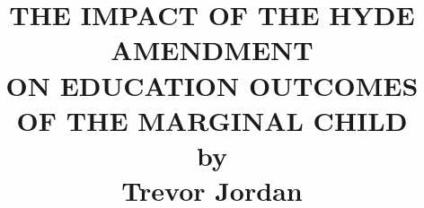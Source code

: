 \documentclass[12pt, times, oneside]{article}
\title{\normalsize{
        THE IMPACT OF THE HYDE AMENDMENT \\
        ON EDUCATION OUTCOMES OF THE MARGINAL CHILD \vspace{5em} \\
        by \vspace{5em} \\
        Trevor Jordan
        }}
\date{}
\author{}
\begin{document}








\nocite{*}
\printbibliography[title={Bibliography}]
    \newpage
\begin{appendices}
\end{appendices}
\end{document}
